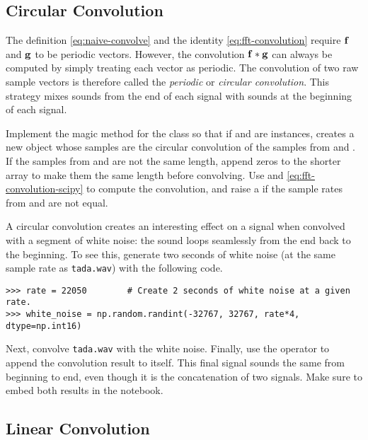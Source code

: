 \subsection*{Circular Convolution} %

The definition \eqref{eq:naive-convolve} and the identity \eqref{eq:fft-convolution} require $\mathbf{f}$ and $\mathbf{g}$ to be periodic vectors.
However, the convolution $\mathbf{f} \ast \mathbf{g}$ can always be computed by simply treating each vector as periodic.
The convolution of two raw sample vectors is therefore called the \emph{periodic} or \emph{circular convolution}.
This strategy mixes sounds from the end of each signal with sounds at the beginning of each signal.

\begin{problem} %
\item Implement the  magic method for the  class so that if  and  are  instances,  creates a new  object whose samples are the circular convolution of the samples from  and .
If the samples from  and  are not the same length, append zeros to the shorter array to make them the same length before convolving.
Use  and \eqref{eq:fft-convolution-scipy} to compute the convolution, and raise a  if the sample rates from  and  are not equal.

A circular convolution creates an interesting effect on a signal when convolved with a segment of white noise: the sound loops seamlessly from the end back to the beginning.
To see this, generate two seconds of white noise (at the same sample rate as \texttt{tada.wav}) with the following code.
\begin{lstlisting}
>>> rate = 22050        # Create 2 seconds of white noise at a given rate.
>>> white_noise = np.random.randint(-32767, 32767, rate*4, dtype=np.int16)
\end{lstlisting}
Next, convolve \texttt{tada.wav} with the white noise.
Finally, use the \li{>>} operator to append the convolution result to itself.
This final signal sounds the same from beginning to end, even though it is the concatenation of two signals.
Make sure to embed both results in the notebook.
\end{problem}

\subsection*{Linear Convolution} %

